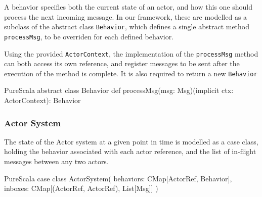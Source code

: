 \documentclass[a4paper,twoside]{article}
\newcommand{\InlineS}[1]{\lstinline[language=PureScala,basicstyle=\small\ttfamily,columns=fixed]|#1|}
\begin{document}
\begin{enumerate}
A behavior specifies both the current state of an actor, and how this one should 
process the next incoming message. In our framework, these are modelled as a subclass 
of the abstract class \InlineS{Behavior}, which defines a single abstract method 
\InlineS{processMsg}, to be overriden for each defined behavior.

Using the provided \InlineS{ActorContext}, the implementation of the \InlineS{processMsg}
method can both access its own reference, and register messages to be sent after the
execution of the method is complete. It is also required to return a new \InlineS{Behavior}

\begin{ShortCode}{PureScala}
abstract class Behavior {
  def processMsg(msg: Msg)(implicit ctx: ActorContext): Behavior
}
\end{ShortCode}

%
%

\vspace{-15pt}
\subsubsection*{Actor System}

The state of the Actor system at a given point in time is modelled as a case class, 
holding the behavior associated with each actor reference, and the list of in-flight messages between any two actors.


\begin{ShortCode}{PureScala}
case class ActorSystem(
  behaviors: CMap[ActorRef, Behavior],
  inboxes: CMap[(ActorRef, ActorRef), List[Msg]]
)
\end{ShortCode}


\end{enumerate}
\end{document}
